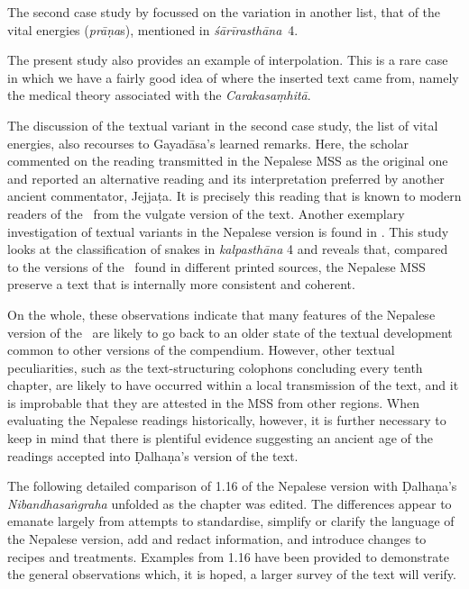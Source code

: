 The second case study by \citet{kleb-2021b} focussed on the variation in another
list, that of the vital energies (\emph{prāṇa}s), mentioned in
\emph{śārīrasthāna}~4.

The present study also provides an example of interpolation.  This is a rare case
in which we have a fairly good idea of where the inserted text came from, namely
the medical theory associated with the \emph{Carakasaṃhitā}.


The  discussion of the textual variant in the second case study,
the list of vital energies, also recourses to Gayadāsa's learned remarks. Here,
the scholar commented on the reading transmitted in the Nepalese MSS as the
original one and reported an alternative reading and its interpretation preferred
by another ancient commentator, Jejjaṭa. It is precisely this reading that is known to modern
readers of the \SS\ from the vulgate version of the text. Another exemplary
investigation of textual variants in the Nepalese version is found in
\citet[101–104]{hari-2011}. This study looks at the classification of snakes in
\emph{kalpasthāna} 4 and reveals that, compared to the versions of the \SS\ found
in different printed sources, the Nepalese MSS preserve a text that is internally
more consistent and coherent.

On the whole, these observations indicate that many features of the Nepalese version of the \SS\ are likely to go back to an older state of the textual development common to other versions of the compendium. 
However, other textual peculiarities, such as the text-structuring colophons concluding every tenth chapter, are likely to have occurred within a local transmission of the text, and it is improbable that they are attested in the MSS from other regions. 
When evaluating the Nepalese readings historically, however, it is further necessary to keep in mind that there is plentiful evidence suggesting an ancient age of the readings accepted into Ḍalhaṇa's version of the text. 


The following detailed comparison of 1.16 of the Nepalese version with Ḍalhaṇa's \emph{Nibandhasaṅgraha} unfolded as the chapter was edited. The differences appear to emanate largely from attempts to standardise, simplify or clarify the language of the Nepalese version, add and redact information, and introduce changes to recipes and treatments. Examples from 1.16 have been provided to demonstrate the general observations which, it is hoped, a larger survey of the text will verify.

